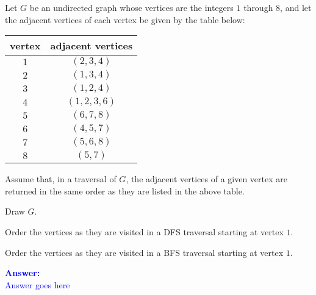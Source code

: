 \item{}
Let $G$ be an undirected graph whose vertices are the integers $1$ through $8$,
and let the adjacent vertices of each vertex be given by the table below:\\[6pt]
\begin{tabular}{|c|c|}\hline
    {\bf vertex} & {\bf adjacent vertices} \\ \hline\hline
    $1$ & $(2, 3, 4)$ \\ \hline
    $2$ & $(1, 3, 4)$ \\ \hline
    $3$ & $(1, 2, 4)$ \\ \hline
    $4$ & $(1, 2, 3, 6)$ \\ \hline
    $5$ & $(6, 7, 8)$ \\ \hline
    $6$ & $(4, 5, 7)$ \\ \hline
    $7$ & $(5, 6, 8)$ \\ \hline
    $8$ & $(5, 7)$ \\ \hline
\end{tabular}
\parend
Assume that, in a traversal of $G$, the adjacent vertices of a given vertex are
returned in the same order as they are listed in the above table.\parend

\begin{list}{\textbf{}}{}
    \item Draw $G$.
    \item Order the vertices as they are visited in a DFS traversal starting at
        vertex $1$.
    \item Order the vertices as they are visited in a BFS traversal starting at
        vertex $1$.
\end{list}
\vskip12pt
\ifanswers
\textcolor{blue}{
\textbf{Answer:}\\[6pt]
Answer goes here
}
\newpage
\fi
